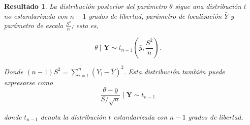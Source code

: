 \documentclass[
  10pt,
  spanish,
]{book}
\newtheorem{proposition}{Resultado}[chapter]
\theoremstyle{definition}
\theoremstyle{definition}
\theoremstyle{definition}
\theoremstyle{definition}
\theoremstyle{remark}
\begin{document}
\begin{proposition}
\protect\hypertarget{prp:PosThetaNoInformativa}{}{\label{prp:PosThetaNoInformativa} }La distribución posterior del parámetro \(\theta\) sigue una distribución \(t\) no estandarizada con \(n-1\) grados de libertad, parámetro de localización \(\bar{Y}\) y parámetro de escala \(\frac{S^2}{n}\); esto es,

\begin{equation*}
\theta \mid \mathbf{Y}\sim t_{n-1}\left(\bar{y},\frac{S^2}{n}\right).
\end{equation*}

Donde \((n-1)S^2=\sum_{i=1}^n(Y_i-\bar{Y})^2\). Esta distribución también puede expresarse como
\begin{equation*}
\frac{\theta-\bar{y}}{S/\sqrt{n}} \mid \mathbf{Y} \sim t_{n-1}
\end{equation*}

donde \(t_{n-1}\) denota la distribución \(t\) estandarizada con \(n-1\) grados de libertad.
\end{proposition}
\end{document}
